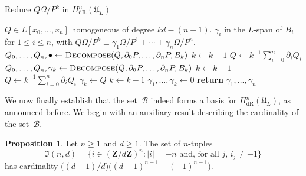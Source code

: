 \documentclass[a4paper,11pt]{article}
\numberwithin{equation}{section}
\providecommand{\abs}[1]{\lvert#1\rvert}                 %
\newcommand{\ZZ}{\mathbf{Z}} %
\providecommand{\HdR}{H_{\text{dR}}}    %
\providecommand{\cB}{\mathcal{B}} %
\theoremstyle{definition}
\newtheorem{prop}[thm]{Proposition}
\begin{document}
\begin{algorithm}
\caption{Reduce $Q \Omega / P^k$ in $\HdR^n(\mathfrak{U}_L)$}
\label{alg:PoleRed}
\begin{algorithmic}
\vspace{1mm}
\Require $Q \in L[x_0, \dotsc, x_n]$ homogeneous of degree $kd - (n+1)$.
\Ensure  $\gamma_i$ in the $L$-span of $B_i$ for $1 \leq i \leq n$, with  
         $Q \Omega / P^k \equiv \gamma_{1} \Omega / P^{1} + \dotsb + \gamma_n \Omega / P^n$.
\State $Q_0, \dotsc, Q_n, \bullet \gets \Call{Decompose}{Q, \partial_0 P, \dotsc, \partial_n P, B_k}$
\State $k \gets k-1$
\State $Q \gets k^{-1} \sum_{i=0}^n \partial_i Q_i$
\EndWhile
{}
\State $Q_0, \dotsc, Q_n, \gamma_k \gets \Call{Decompose}{Q, \partial_0 P, \dotsc, \partial_n P, B_k}$
\State $k \gets k-1$
\State $Q \gets k^{-1} \sum_{i=0}^n \partial_i Q_i$
\EndWhile
{}
\State $\gamma_{k} \gets Q$
\State $k \gets k-1$
\EndIf
\State $\gamma_{1}, \dotsc, \gamma_{k} \gets 0$
\State \textbf{return} $\gamma_{1}, \dotsc, \gamma_n$
\EndProcedure
\end{algorithmic}
\end{algorithm}

We now finally establish that the set~$\cB$ indeed forms a basis for 
$\HdR^n(\mathfrak{U}_L)$, as announced before.  We begin with an 
auxiliary result describing the cardinality of the set~$\cB$.

\begin{prop} \label{prop:BasisSize}
Let $n \geq 1$ and $d \geq 1$.  The set of $n$-tuples 
\begin{equation}
\mathfrak{I}(n,d) = 
    \{ i \in (\ZZ / d \ZZ)^{n} : \abs{i} = -n \text{ and, for all $j$, } i_j \neq -1 \}
\end{equation}
has cardinality $\bigl((d-1)/d\bigr) \bigl((d-1)^{n-1} - (-1)^{n-1}\bigr)$.
\end{prop}
\end{document}
